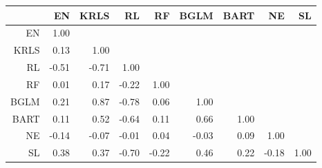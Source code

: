 \begin{table}[ht]
\centering
\begin{tabular}{rrrrrrrrr}
  \hline
 & EN & KRLS & RL & RF & BGLM & BART & NE & SL \\ 
  \hline
EN & 1.00 &  &  &  &  &  &  &  \\ 
  KRLS & 0.13 & 1.00 &  &  &  &  &  &  \\ 
  RL & -0.51 & -0.71 & 1.00 &  &  &  &  &  \\ 
  RF & 0.01 & 0.17 & -0.22 & 1.00 &  &  &  &  \\ 
  BGLM & 0.21 & 0.87 & -0.78 & 0.06 & 1.00 &  &  &  \\ 
  BART & 0.11 & 0.52 & -0.64 & 0.11 & 0.66 & 1.00 &  &  \\ 
  NE & -0.14 & -0.07 & -0.01 & 0.04 & -0.03 & 0.09 & 1.00 &  \\ 
  SL & 0.38 & 0.37 & -0.70 & -0.22 & 0.46 & 0.22 & -0.18 & 1.00 \\ 
   \hline
\end{tabular}
\end{table}
